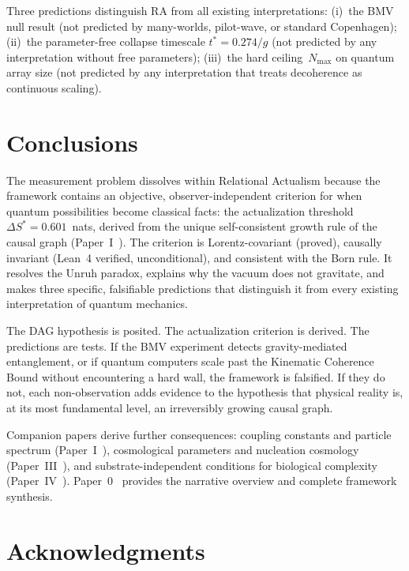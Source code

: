 \documentclass[11pt,a4paper]{article}
\theoremstyle{plain}
\theoremstyle{definition}
\theoremstyle{remark}
\begin{document}
Three predictions distinguish RA from all existing interpretations: (i)~the BMV null
result (not predicted by many-worlds, pilot-wave, or standard Copenhagen); (ii)~the
parameter-free collapse timescale $t^* = 0.274/g$ (not predicted by any
interpretation without free parameters); (iii)~the hard ceiling~$N_{\max}$ on
quantum array size (not predicted by any interpretation that treats decoherence as
continuous scaling).

\section{Conclusions}\label{sec:conclusions}

The measurement problem dissolves within Relational Actualism because the framework
contains an objective, observer-independent criterion for when quantum possibilities
become classical facts: the actualization threshold $\Delta S^* = 0.601$~nats,
derived from the unique self-consistent growth rule of the causal graph
(Paper~I~\cite{P1}).  The criterion is Lorentz-covariant (proved), causally
invariant (Lean~4 verified, unconditional), and consistent with the Born rule.  It
resolves the Unruh paradox, explains why the vacuum does not gravitate, and makes
three specific, falsifiable predictions that distinguish it from every existing
interpretation of quantum mechanics.

The DAG hypothesis is posited.  The actualization criterion is derived.  The
predictions are tests.  If the BMV experiment detects gravity-mediated entanglement,
or if quantum computers scale past the Kinematic Coherence Bound without
encountering a hard wall, the framework is falsified.  If they do not, each
non-observation adds evidence to the hypothesis that physical reality is, at its most
fundamental level, an irreversibly growing causal graph.

Companion papers derive further consequences: coupling constants and particle
spectrum (Paper~I~\cite{P1}), cosmological parameters and nucleation cosmology
(Paper~III~\cite{P3}), and substrate-independent conditions for biological
complexity (Paper~IV~\cite{P4}).  Paper~0~\cite{P0} provides the narrative overview
and complete framework synthesis.

\section*{Acknowledgments}
\end{document}

